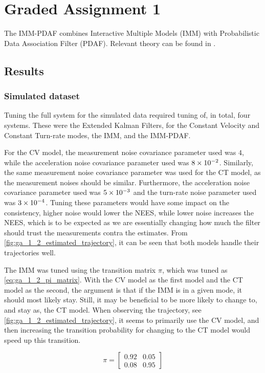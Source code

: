 \section{Graded Assignment 1}\label{sec:graded_assignment_1}
The IMM-PDAF combines Interactive Multiple Models (IMM) with Probabilistic Data Association Filter (PDAF). Relevant theory can be found in \cite[p. 100-101, 120 - 122]{Edmund}. 

\subsection*{Results}
\subsubsection*{Simulated dataset}
Tuning the full system for the simulated data required tuning of, in total, four systems. These were the Extended Kalman Filters, for the Constant Velocity and Constant Turn-rate modes, the IMM, and the IMM-PDAF. 

For the CV model, the measurement noise covariance parameter used was $4$, while the acceleration noise covariance parameter used was ${8} \times 10^{-2}$. Similarly, the same measurement noise covariance parameter was used for the CT model, as the measurement noises should be similar. Furthermore, the acceleration noise covariance parameter used was ${5} \times 10^{-3}$ and the turn-rate noise parameter used was ${3} \times 10^{-4}$. Tuning these parameters would have some impact on the consistency, higher noise would lower the NEES, while lower noise increases the NEES, which is to be expected as we are essentially changing how much the filter should trust the measurements contra the estimates. From \cref{fig:ga_1_2_estimated_trajectory}, it can be seen that both models handle their trajectories well. 

The IMM was tuned using the transition matrix $\pi$, which was tuned as \cref{eq:ga_1_2_pi_matrix}. With the CV model as the first model and the CT model as the second, the argument is that if the IMM is in a given mode, it should most likely stay. Still, it may be beneficial to be more likely to change to, and stay as, the CT model. When observing the trajectory, see \cref{fig:ga_1_2_estimated_trajectory}, it seems to primarily use the CV model, and then increasing the transition probability for changing to the CT model would speed up this transition. 

\begin{equation}
    \label{eq:ga_1_2_pi_matrix}
    \pi = \begin{bmatrix}
        0.92 & 0.05 \\
        0.08 & 0.95
    \end{bmatrix}
\end{equation}

